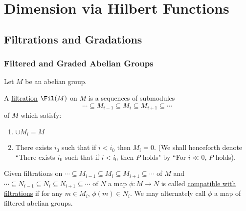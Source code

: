 \documentclass[12 pt]{article}
\theoremstyle{definition}
\begin{document}
\newpage




\section{Dimension via Hilbert Functions}

\subsection{Filtrations and Gradations}

\subsubsection{Filtered and Graded Abelian Groups}
Let $M$ be an abelian group.
\begin{definition} A \underline{filtration} $\Fil(M)$ on $M$ is a sequences of submodules
\[\cdots \subseteq M_{i-1} \subseteq M_i \subseteq M_{i+1} \subseteq \cdots\]
of $M$ which satisfy:
\begin{enumerate}
\item $\cup M_i=M$
\item There exists $i_0$ such that if $i<i_0$ then $M_i=0$. (We shall henceforth denote ``There exists $i_0$ such that if $i<i_0$ then $P$ holds" by ``For $i \ll 0$, $P$ holds).
\end{enumerate}
\end{definition}

\begin{definition} Given filtrations on $\cdots \subseteq M_{i-1} \subseteq M_i \subseteq M_{i+1} \subseteq \cdots $ of $M$ and $\cdots \subseteq N_{i-1} \subseteq N_i \subseteq N_{i+1} \subseteq \cdots$ of $N$ a map $\phi:M \to N$ is called \underline{compatible with filtrations} if for any $m \in M_i$, $\phi(m) \in N_i$. We may alternately call $\phi$ a map of filtered abelian groups.
\end{definition}
\end{document}

